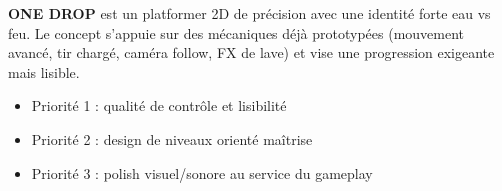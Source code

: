﻿\documentclass[12pt,a4paper]{article}
\begin{document}
\textbf{ONE DROP} est un platformer 2D de précision avec une identité forte eau vs feu.
Le concept s'appuie sur des mécaniques déjà prototypées (mouvement avancé, tir chargé, caméra follow, FX de lave) et vise une progression exigeante mais lisible.

\begin{itemize}[noitemsep]
    \item Priorité 1 : qualité de contrôle et lisibilité
    \item Priorité 2 : design de niveaux orienté maîtrise
    \item Priorité 3 : polish visuel/sonore au service du gameplay
\end{itemize}
\end{document}
